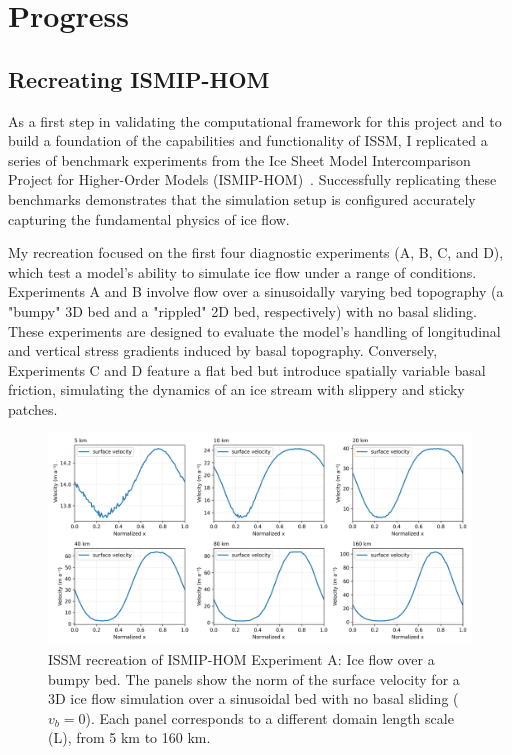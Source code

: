 \chapter{Progress}\label{progress}

\section{Recreating ISMIP-HOM}

As a first step in validating the computational framework for this project and to build a foundation of the capabilities and functionality of ISSM, I replicated a series of benchmark experiments from the Ice Sheet Model Intercomparison Project for Higher-Order Models (ISMIP-HOM)~\cite{Pattyn_2008}. Successfully replicating these benchmarks demonstrates that the simulation setup is configured accurately capturing the fundamental physics of ice flow.  

My recreation focused on the first four diagnostic experiments (A, B, C, and D), which test a model's ability to simulate ice flow under a range of conditions. Experiments A and B involve flow over a sinusoidally varying bed topography (a "bumpy" 3D bed and a "rippled" 2D bed, respectively) with no basal sliding. These experiments are designed to evaluate the model's handling of longitudinal and vertical stress gradients induced by basal topography. Conversely, Experiments C and D feature a flat bed but introduce spatially variable basal friction, simulating the dynamics of an ice stream with slippery and sticky patches.

\begin{figure}[H]
    \includegraphics[scale=0.45]{ExpA_velocity_panels.png}
    \caption{ISSM recreation of ISMIP-HOM Experiment A: Ice flow over a bumpy bed. The panels show the norm of the surface velocity for a 3D ice flow simulation over a sinusoidal bed with no basal sliding ($v_b=0$). Each panel corresponds to a different domain length scale (L), from 5 km to 160 km.}
    \label{fig:4.1}
\end{figure}

